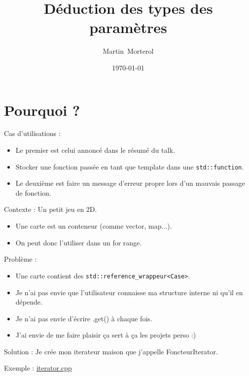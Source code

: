 \documentclass{beamer}
\title{Déduction des types des paramètres}
\author{Martin~Morterol}
\date{\today}
\begin{document}
\begin{frame}[plain]
\titlepage
\end{frame}

\section{Pourquoi ?}
\begin{frame}
	Cas d'utilisations : 
	\begin{itemize}
		\item Le premier est celui annoncé dans le résumé du talk.
		\item[] Stocker une fonction passée en tant que template dans une \lstinline{std::function}.
		\item Le deuxième est faire un message d'erreur propre lors d'un mauvais passage de fonction.
	\end{itemize}
\end{frame}
\begin{frame}
	Contexte : Un petit jeu en 2D.
    \begin{itemize}
    	\item Une carte est un conteneur (comme vector, map...).
    	\item On peut donc l'utiliser dans un for range.
    \end{itemize}
    Problème : 
    \begin{itemize}
    	\item Une carte contient des \lstinline{std::reference_wrappeur<Case>}.
    	\item Je n'ai pas envie que l'utilisateur connaisse ma structure interne ni qu'il en dépende.
    	\item Je n'ai pas envie d’écrire .get() à chaque fois. 
    	\item J'ai envie de me faire plaisir ça sert à ça les projets perso :)
    \end{itemize}
    Solution : Je crée mon iterateur maison que j'appelle FoncteurIterator.
  
    
\end{frame}
\begin{frame}[containsverbatim]

	Exemple : \href{run:../code_demo/iterator.cpp}{iterator.cpp}		
		
\end{frame}
\end{document}
